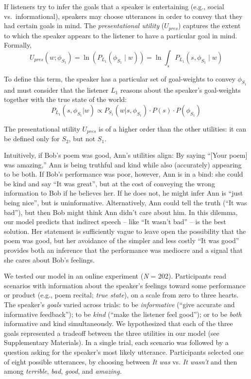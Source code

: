 \documentclass[12pt]{article}
\begin{document}
If listeners try to infer the goals that a speaker is entertaining
(e.g., social vs.~informational), speakers may choose utterances in
order to convey that they had certain goals in mind. The \emph{presentational utility}
(\(U_{pres}\)) captures the extent to which the speaker appears to the
listener to have a particular goal in mind. Formally,
\[U_{pres}(w; \phi_{S_{1}}) = \ln(P_{L_1}(\phi_{S_1} \mid w)) = \ln \int_s P_{L_1}(s, \phi_{S_1} \mid w)\]

\noindent To define this term, the speaker has a particular set of goal-weights to convey $\phi_{S_{1}}$ and must consider that the listener \(L_1\) reasons about the speaker's goal-weights together with the true state of the world:
\[P_{L_1}(s, \phi_{S_{1}}| w) \propto P_{S_1}(w | s, \phi_{S_{1}}) \cdot P(s) \cdot P(\phi_{S_{1}})\]

\noindent The presentational utility $U_{pres}$ is of a higher order than the other utilities: it can be defined only for \(S_2\), but not \(S_1\).

Intuitively, if Bob's poem was good, Ann's utilities align:
By saying \enquote{{[}Your poem{]} was amazing,}
Ann is being truthful and kind while also (accurately) appearing to be both.
If Bob's performance was poor, however, Ann is in a bind: she could be kind and say \enquote{It was great}, but at the cost of conveying the wrong information to Bob if he believes her. If he does not, he might infer Ann is \enquote{just being nice}, but is uninformative.
Alternatively, Ann could tell the truth (\enquote{It was bad}), but then
Bob might think Ann didn't care about him. In this dilemma, our model predicts that indirect speech -- like \enquote{It wasn't bad} -- is the best solution. Her statement is sufficiently vague to leave open the possibility that the poem was good, but her avoidance of the simpler and less costly \enquote{It was good} provides both an inference that the performance was mediocre and a signal that she cares about Bob's feelings.


We tested our model in an online experiment (\emph{N} = 202).
Participants read scenarios with information about the speaker's
feelings toward some performance or product (e.g., poem recital;
\emph{true state}), on a scale from zero to three hearts. The speaker's \emph{goals} varied across trials: to be \emph{informative}
(\enquote{give accurate and informative feedback}); to be \emph{kind}
(\enquote{make the listener feel good}); or to be \emph{both}
informative and kind simultaneously. We hypothesized that each of the
three goals represented a tradeoff between the three utilities in our
model (see Supplementary Materials). In a single trial, each scenario
was followed by a question asking for the speaker's most likely utterance.
Participants selected one of eight possible utterances, by choosing
between \emph{It was} vs. \emph{It wasn't} and then among
\emph{terrible}, \emph{bad}, \emph{good}, and \emph{amazing.}
\end{document}
